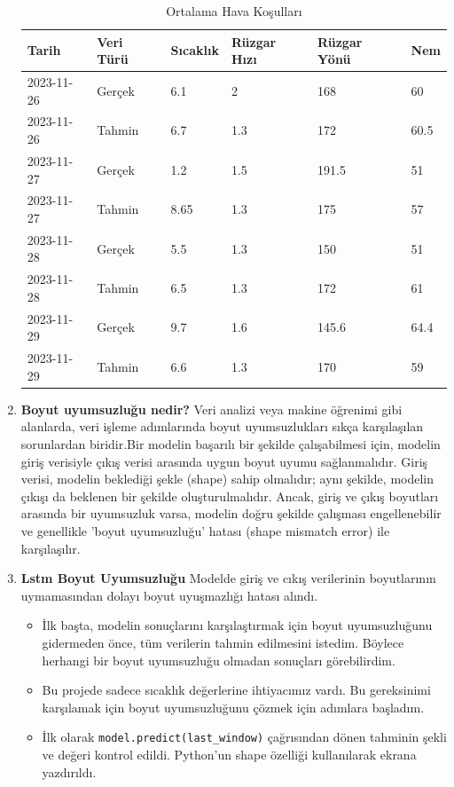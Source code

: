 \documentclass[12pt,a4paper]{article}
\begin{document}
\begin{enumerate}
\begin{table}[h]
\centering
\caption{Ortalama Hava Koşulları}
\begin{tabular}{|l|l|l|l|l|l|}
\hline
\textbf{Tarih} & \textbf{Veri Türü} & \textbf{Sıcaklık} & \textbf{Rüzgar Hızı} & \textbf{Rüzgar Yönü} & \textbf{Nem} \\ \hline
2023-11-26 & Gerçek & 6.1 & 2 & 168    & 60 \\ \hline
2023-11-26 & Tahmin & 6.7 & 1.3  & 172 & 60.5\\ \hline
2023-11-27 & Gerçek & 1.2  & 1.5  & 191.5 &51 \\ \hline
2023-11-27 & Tahmin & 8.65 &1.3 & 175 & 57 \\ \hline
2023-11-28 & Gerçek & 5.5 & 1.3 & 150     & 51\\ \hline
2023-11-28 & Tahmin & 6.5 & 1.3 & 172 &61 \\ \hline
2023-11-29 & Gerçek & 9.7 & 1.6 & 145.6     & 64.4 \\ \hline
2023-11-29 & Tahmin &6.6      &1.3      & 170   & 59 \\ \hline

\end{tabular}
\end{table}
\newpage
\item {\bf\fontsize{12pt}{14pt}\selectfont Boyut uyumsuzluğu nedir? }\newline\newline
  Veri analizi veya makine öğrenimi gibi alanlarda, veri işleme adımlarında boyut uyumsuzlukları sıkça karşılaşılan sorunlardan biridir.Bir modelin başarılı bir şekilde çalışabilmesi için, modelin giriş verisiyle çıkış verisi arasında uygun boyut uyumu sağlanmalıdır. Giriş verisi, modelin beklediği şekle (shape) sahip olmalıdır; aynı şekilde, modelin çıkışı da beklenen bir şekilde oluşturulmalıdır. Ancak, giriş ve çıkış boyutları arasında bir uyumsuzluk varsa, modelin doğru şekilde çalışması engellenebilir ve genellikle 'boyut uyumsuzluğu' hatası (shape mismatch error) ile karşılaşılır.

\item {\bf\fontsize{12pt}{14pt}\selectfont Lstm Boyut Uyumsuzluğu }\newline\newline
Modelde giriş ve cıkış verilerinin boyutlarının uymamasından dolayı boyut uyuşmazlığı hatası alındı.
\begin{itemize}
    \item İlk başta, modelin sonuçlarını karşılaştırmak için boyut uyumsuzluğunu gidermeden önce, tüm verilerin tahmin edilmesini istedim. Böylece herhangi bir boyut uyumsuzluğu olmadan sonuçları görebilirdim.
    \item Bu projede sadece sıcaklık değerlerine ihtiyacımız vardı. Bu gereksinimi karşılamak için boyut uyumsuzluğunu çözmek için adımlara başladım.
\item İlk olarak \texttt{model.predict(last\_window)} çağrısından dönen tahminin şekli ve değeri kontrol edildi. Python'un shape özelliği kullanılarak ekrana yazdırıldı.
\begin{figure}[h]
  	

\end{figure}
\end{itemize}
\end{enumerate}
\end{document}

